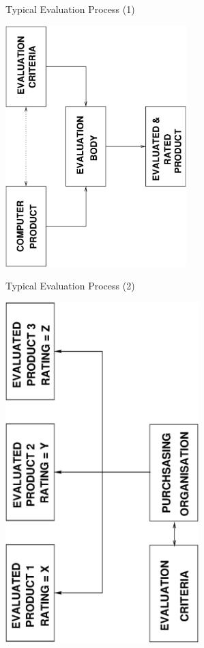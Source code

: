 \documentclass[xcolor=dvipsname,t]{beamer}
\begin{document}
\begin{frame} {Typical Evaluation Process (1)} 
    \vspace{1cm}
    \begin{center}
        \includegraphics[angle=-90, width=7cm]{process.eps}
    \end{center}
\end{frame}

\begin{frame} {Typical Evaluation Process (2)}
    \vspace{1cm}
    \begin{center}
        \includegraphics[angle=-90, width=7.5cm]{customer.eps}
    \end{center}
\end{frame}
\end{document}
